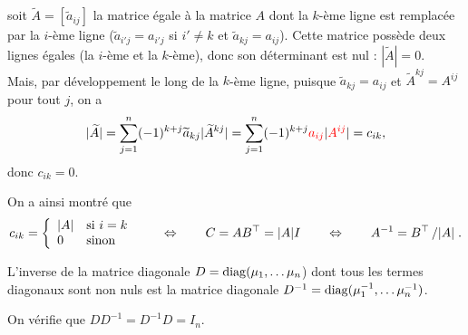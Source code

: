 \begin{description}
  soit $\widetilde{A} = [\widetilde{a}_{ij}]$ la matrice égale à la matrice $A$ dont la $k$-ème ligne est remplacée par la $i$-ème ligne ($\widetilde{a}_{i'j} = a_{i'j}$ si $i' \neq k$ et $\widetilde{a}_{kj} = a_{ij}$). Cette matrice possède deux lignes égales (la $i$-ème et la $k$-ème), donc son déterminant est nul : $|\widetilde{A}| = 0$. \\
  Mais, par développement le long de la $k$-ème ligne, puisque $\widetilde{a}_{kj} = a_{ij}$ et $\widetilde{A}^{kj}= A^{ij}$ pour tout $j$, on a
  $$
  |\widetilde{A}|
  = \sum_{j=1}^n (-1)^{k+j} \widetilde{a}_{kj} |\widetilde{A}^{kj}|
  = \sum_{j=1}^n (-1)^{k+j} \textcolor{red}{a_{ij}} |\textcolor{red}{A^{ij}}|
  = c_{ik}, 
  $$
  donc $c_{ik} = 0$.
\end{description}
On a ainsi montré que
$$
c_{ik} = \left\{\begin{array}{ll} 
                  |A| & \text{si $i = k$} \\
                  0 & \text{sinon}
                \end{array} \right.
\qquad \Leftrightarrow \qquad
C = AB^\top = |A| I
\qquad \Leftrightarrow \qquad
A^{-1} = B^\top \left/|A|\right..
$$
\eproof

\begin{lemma}
  L'inverse de la matrice diagonale $D = \operatorname{diag}(\mu_1, \dots \mu_n$) dont tous les termes diagonaux sont non nuls est la matrice diagonale $D^{-1} = \operatorname{diag}(\mu_1^{-1}, \dots \mu_n^{-1})$.
\end{lemma}

\proof
On vérifie que $D D^{-1} = D^{-1} D = I_n$.
\eproof
